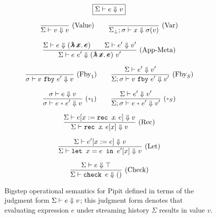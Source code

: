 
\begin{figure}
  \[ \boxed{\Sigma \vdash e \Downarrow v} \]

  \[
    \enskip \frac {\displaystyle } {\displaystyle \Sigma \vdash v \Downarrow v} \  \mbox{(Value)} \enskip
    \quad
    \enskip \frac {\displaystyle } {\displaystyle \Sigma_\bot; \sigma \vdash x \Downarrow \sigma(v)} \  \mbox{(Var)} \enskip
  \]

  \[
    \ruleIN{
      \bigstep{\Sigma}{e}{(\mlamX)}
      \qquad
      \bigstep{\Sigma}{e'}{v'}
    }{\bigstep{\Sigma}{e~e'}{(\mlamX)~v'}}{App-Meta}
  \]


  \[
    \enskip \frac {\displaystyle } {\displaystyle \sigma \vdash v~\texttt{fby}~e' \Downarrow v} \  \mbox{($\mbox{Fby}_1$)} \enskip
    \quad
    \enskip \frac {\displaystyle \Sigma \vdash e' \Downarrow v'} {\displaystyle \Sigma; \sigma \vdash v~\texttt{fby}~e' \Downarrow v'} \  \mbox{($\mbox{Fby}_S$)} \enskip
  \]

  \[
    \ruleIN{\bigstep{\sigma}{e}{v}}{\bigstep{\sigma}{\xthen{e}{e'}}{v}}{$\xthenarrow_1$}
    \quad
    \ruleIN{\bigstep{\Sigma}{e'}{v'}}{\bigstep{\Sigma; \sigma}{\xthen{e}{e'}}{v'}}{$\xthenarrow_S$}
  \]

  \[
    \enskip \frac {\displaystyle 
      \Sigma \vdash e[x := \texttt{rec~} x \!.~e] \Downarrow v
    } {\displaystyle 
      \Sigma \vdash \texttt{rec~} x \!.~e[x] \Downarrow v
    } \  \mbox{(Rec)} \enskip
  \]

  \[
    \enskip \frac {\displaystyle 
      \Sigma \vdash e'[x := e] \Downarrow v
    } {\displaystyle 
      \Sigma \vdash \texttt{let~} x = e \texttt{~in~} e'[x] \Downarrow v
    } \  \mbox{(Let)} \enskip
  \]

  \[
    \enskip \frac {\displaystyle 
      \Sigma \vdash e \Downarrow \top
    } {\displaystyle 
      \Sigma \vdash \texttt{check~} e \Downarrow ()
    } \  \mbox{(Check)} \enskip
  \]

  \caption{Bigstep operational semantics for Pipit defined in terms of the judgment form $\Sigma \vdash e \Downarrow v$; this judgment form denotes that evaluating expression $e$ under streaming history $\Sigma$ results in value $v$.}\label{f:core-bigstep}
\end{figure}